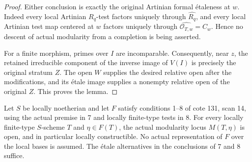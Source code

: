 \begin{proof}
Either conclusion is exactly the original Artinian formal
\'etaleness at $w$.  Indeed every local Artinian $R_q$-test
factors uniquely through $\widehat{R_q}$, and every local
Artinian test map centered at $w$ factors uniquely through
$\widehat{\mathcal O_{T,w}}=C_w$.  Hence no descent of
actual modularity from a completion is being asserted.

For a finite morphism, primes over $I$ are incomparable.
Consequently, near $z$, the retained irreducible component of
the inverse image of $V(I)$ is precisely the original stratum
$Z$.  The open $W$ supplies the desired relative open after
the modifications, and its \'etale image supplies a nonempty
relative open of the original $Z$.  This proves the lemma.
\end{proof}

\begin{theorem}
\label{A:L1-general}
Let $S$ be locally noetherian and let $F$ satisfy conditions
1--8 of cote 131, scan 14, using the actual premise in 7 and
locally finite-type tests in 8.  For every locally finite-type
$S$-scheme $T$ and $\eta\in F(T)$, the actual modularity locus
$M(T,\eta)$ is open, and in particular locally constructible.
No actual representation of $F$ over the local bases is assumed.
The \'etale alternatives in the conclusions of 7 and 8 suffice.
\end{theorem}
